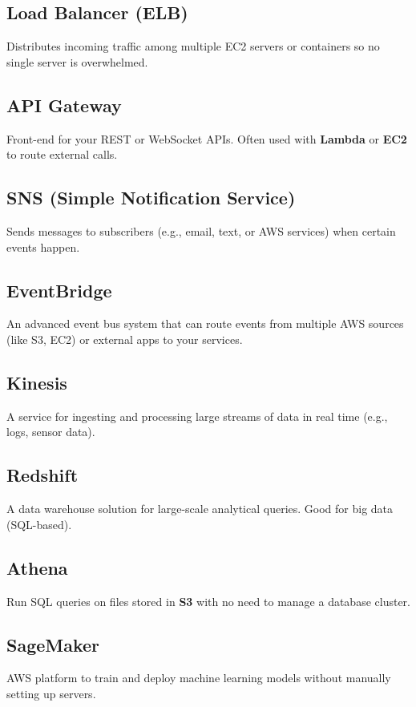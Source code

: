 \documentclass[12pt]{article}
\begin{document}
\subsection*{Load Balancer (ELB)}
Distributes incoming traffic among multiple EC2 servers or containers so no single server is overwhelmed.

\subsection*{API Gateway}
Front-end for your REST or WebSocket APIs. Often used with \textbf{Lambda} or \textbf{EC2} to route external calls.

\subsection*{SNS (Simple Notification Service)}
Sends messages to subscribers (e.g., email, text, or AWS services) when certain events happen.

\subsection*{EventBridge}
An advanced event bus system that can route events from multiple AWS sources (like S3, EC2) or external apps to your services.

\subsection*{Kinesis}
A service for ingesting and processing large streams of data in real time (e.g., logs, sensor data).

\subsection*{Redshift}
A data warehouse solution for large-scale analytical queries. Good for big data (SQL-based).

\subsection*{Athena}
Run SQL queries on files stored in \textbf{S3} with no need to manage a database cluster.

\subsection*{SageMaker}
AWS platform to train and deploy machine learning models without manually setting up servers.
\end{document}
